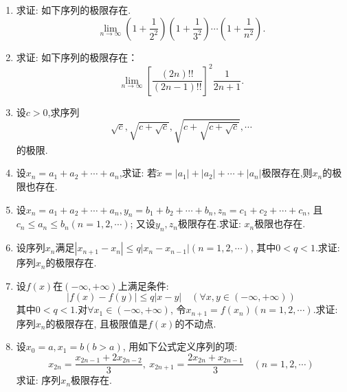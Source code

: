 \begin{enumerate}
\begin{solution}
	\end{solution}
	\item 求证: 如下序列的极限存在.
	$$
	\lim\limits_{n\rightarrow \infty}(1+\frac{1}{2^2})(1+\frac{1}{3^2})\cdots(1+\frac{1}{n^2}).
	$$
	\item 求证: 如下序列的极限存在：
	$$
	\lim\limits_{n\rightarrow \infty} \left[\frac{(2n)!!}{(2n-1)!!}\right]^2\frac{1}{2n+1}.
	$$
	\item 设$c>0$,求序列
	$$
	\sqrt{c}, \sqrt{c+\sqrt{c}},\sqrt{c+\sqrt{c+\sqrt{c}}}, \cdots
	$$
	的极限.
	\item 设$x_n=a_1+a_2+\cdots+a_n$,求证: 若$\tilde{x}=|a_1|+|a_2|+\cdots+|a_n|$极限存在,则${x_n}$的极限也存在.
	\item 设$x_n=a_1+a_2+\cdots+a_n,y_n=b_1+b_2+\cdots+b_n,z_n=c_1+c_2+\cdots+c_n$, 且$c_n\le a_n\le b_n(n=1,2,\cdots)$; 又设${y_n},{z_n}$极限存在.求证: ${x_n}$极限也存在.
  	\item 设序列${x_n}$满足$|x_{n+1}-x_n|\le q|x_n-x_{n-1}|(n=1,2,\cdots)$, 其中$0<q<1$.求证:
	序列${x_n}$的极限存在.
	\item 设$f(x)$在$(-\infty,+\infty)$上满足条件:
	$$|f(x)-f(y)|\le q|x-y|\quad (\forall x,y \in (-\infty,+\infty))$$
	其中$0<q<1$.对$\forall x_1\in (-\infty,+\infty)$, 令$x_{n+1}=f(x_n)(n=1,2,\cdots)$.求证: 序列${x_n}$的极限存在, 且极限值是$f(x)$的不动点.
	\item 设$x_0=a,x_1=b(b>a)$, 用如下公式定义序列的项: $$
	x_{2n}=\frac{x_{2n-1}+2x_{2n-2}}{3},\ x_{2n+1}=\frac{2x_{2n}+x_{2n-1}}{3}\quad (n = 1,2,\cdots)$$
	求证: 序列${x_n}$极限存在.
\end{enumerate}
